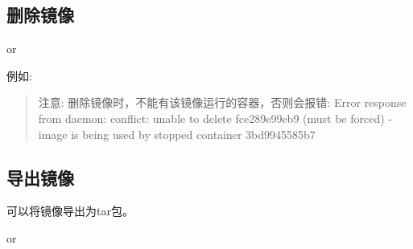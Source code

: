 \documentclass[letterpaper,10pt,english]{sphinxmanual}
\begin{document}
\subsection{删除镜像}
\label{\detokenize{docker/basic_cmd:id8}}
\begin{sphinxVerbatim}[commandchars=\\\{\}]
   
\end{sphinxVerbatim}

or

\begin{sphinxVerbatim}[commandchars=\\\{\}]
   
\end{sphinxVerbatim}

例如:

\begin{sphinxVerbatim}[commandchars=\\\{\}]
   
   
\end{sphinxVerbatim}
\begin{quote}

注意: 删除镜像时，不能有该镜像运行的容器，否则会报错:
Error response from daemon: conflict: unable to delete fce289e99eb9 (must be forced) - image is being used by stopped container 3bd9945585b7
\end{quote}


\subsection{导出镜像}
\label{\detokenize{docker/basic_cmd:id9}}
可以将镜像导出为tar包。

\begin{sphinxVerbatim}[commandchars=\\\{\}]
     
\end{sphinxVerbatim}

or
\end{document}
